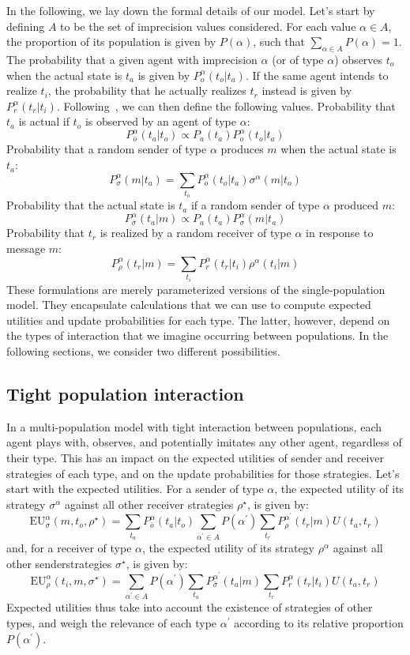 \documentclass[a4paper]{article}
\begin{document}
In the following, we lay down the formal details of our model.
Let's start by defining $A$ to be the set of imprecision values considered.
For each value $\alpha \in A$, the proportion of its population is given by $P(\alpha)$, such that $\sum_{\alpha \in A} P(\alpha) = 1$.
The probability that a given agent with imprecision $\alpha$ (or of type $\alpha$) observes $t_o$ when the actual state is $t_a$ is given by $P_{o}^{\alpha}(t_{o}|t_{a})$.
If the same agent intends to realize $t_i$, the probability that he actually realizes $t_r$ instead is given by $P_{r}^{\alpha}(t_{r}|t_{i})$.
Following~\textcite[26]{franke_vagueness_2017}, we can then define the following values.
Probability that $t_a$ is actual if $t_o$ is observed by an agent of type $\alpha$:
$$
P_{\bar{o}}^{\alpha}(t_{a}|t_{o})\propto P_{a}(t_{a})P_{o}^{\alpha}(t_{o}|t_{a})
$$
Probability that a random sender of type $\alpha$ produces $m$ when the actual state is $t_a$:
$$
P_{\sigma}^{\alpha}(m|t_{a})=\sum_{t_{o}}P_{o}^{\alpha}(t_{o}|t_{a})\sigma^{\alpha}(m|t_{o})
$$
Probability that the actual state is $t_a$ if a random sender of type $\alpha$ produced $m$:
$$
P_{\bar{\sigma}}^{\alpha}(t_{a}|m)\propto P_{a}(t_{a})P_{\sigma}^{\alpha}(m|t_{a})
$$
Probability that $t_r$ is realized by a random receiver of type $\alpha$ in response to message $m$:
$$
P_{\rho}^{\alpha}(t_{r}|m)=\sum_{t_{i}}P_{r}^{\alpha}(t_{r}|t_{i})\rho^{\alpha}(t_{i}|m)
$$
These formulations are merely parameterized versions of the single-population model.
They encapsulate calculations that we can use to compute expected utilities and update probabilities for each type.
The latter, however, depend on the types of interaction that we imagine occurring between populations.
In the following sections, we consider two different possibilities.

\subsection{Tight population interaction}
\label{sec:tight-interaction-model}
In a multi-population model with tight interaction between populations, each agent plays with, observes, and potentially imitates any other agent, regardless of their type.
This has an impact on the expected utilities of sender and receiver strategies of each type, and on the update probabilities for those strategies.
Let's start with the expected utilities.
For a sender of type $\alpha$, the expected utility of its strategy $\sigma^\alpha$ against all other receiver strategies $\rho^\star$, is given by:
$$
\text{EU}_{\sigma}^{\alpha}(m,t_{o},\rho^{\star})=\sum_{t_{a}}P_{\bar{o}}^{\alpha}(t_{a}|t_{o})\sum_{\alpha^{\prime}\in A}P(\alpha^{\prime})\sum_{t_{r}}P_{\rho}^{\alpha^{\prime}}(t_{r}|m)U(t_{a},t_{r})
$$
and, for a receiver of type $\alpha$, the expected utility of its strategy $\rho^\alpha$ against all other senderstrategies $\sigma^\star$, is given by:
$$
\text{EU}_{\rho}^{\alpha}(t_{i},m,\sigma^{\star})=\sum_{\alpha^{\prime}\in A}P(\alpha^{\prime})\sum_{t_{a}}P_{\bar{\sigma}}^{\alpha^{\prime}}(t_{a}|m)\sum_{t_{r}}P_{r}^{\alpha}(t_{r}|t_{i})U(t_{a},t_{r})
$$
Expected utilities thus take into account the existence of strategies of other types, and weigh the relevance of each type $\alpha^\prime$ according to its relative proportion $P(\alpha^\prime)$.
\end{document}
